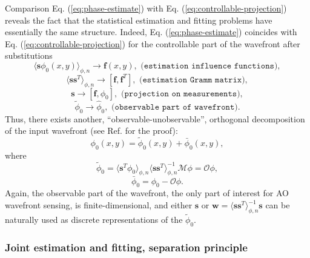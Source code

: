 Comparison Eq. (\ref{eq:phase-estimate}) with Eq.
(\ref{eq:controllable-projection}) reveals the fact that
the statistical estimation and fitting problems have essentially the same
structure. Indeed, Eq. (\ref{eq:phase-estimate}) coincides with Eq.
(\ref{eq:controllable-projection}) for the controllable part of the wavefront
after substitutions
$$
  \langle \bm{s} \phi_{0}(x,y) \rangle_{\phi,n} \rightarrow \bm{f}(x,y), \,\,
  \texttt{(estimation influence functions)},
$$
$$
  \langle \bm{s} \bm{s}^{T} \rangle_{\phi,n} \rightarrow [\bm{f},\bm{f}^{T}],
  \,\, \texttt{(estimation Gramm matrix)},
$$
$$
  \bm{s} \rightarrow [\bm{f},\phi_{0}], \,\,
  \texttt{(projection on measurements)},
$$
$$
  \tilde{\phi}_{0} \rightarrow \hat{\phi}_{0}, \,\,
  \texttt{(observable part of wavefront)}.
$$
Thus, there exists another, ``observable-unobservable'', orthogonal
decomposition of the input wavefront (see Ref. \cite{WibergMaxGavel2} for the
proof):
\begin{equation} \label{eq:observable-unobservable}
	\phi_{0} (x,y) = \tilde{\phi}_{0} (x,y) + \bar{\phi}_{0} (x,y),
\end{equation}
where
\begin{equation} \label{eq:observable-projection}
	\tilde{\phi}_{0} = \langle \bm{s}^{T} \phi_{0} \rangle_{\phi,n}
	             \langle \bm{s} \bm{s}^{T} \rangle_{\phi,n}^{-1}
	             \mathcal{M} \phi = \mathcal{O} \phi,
\end{equation}
\begin{equation} \label{eq:unobservable-projection}
	\bar{\phi}_{0} = \phi_{0} - \mathcal{O} \phi.
\end{equation}
Again, the observable part of the wavefront, the only part of interest for AO
wavefront sensing, is finite-dimensional, and either $\bm{s}$ or
$\bm{w} = \langle \bm{s} \bm{s}^{T} \rangle_{\phi,n}^{-1} \bm{s}$ can be
naturally used as discrete representations of the $\tilde{\phi}_{0}$.

\subsubsection{Joint estimation and fitting, separation principle}


